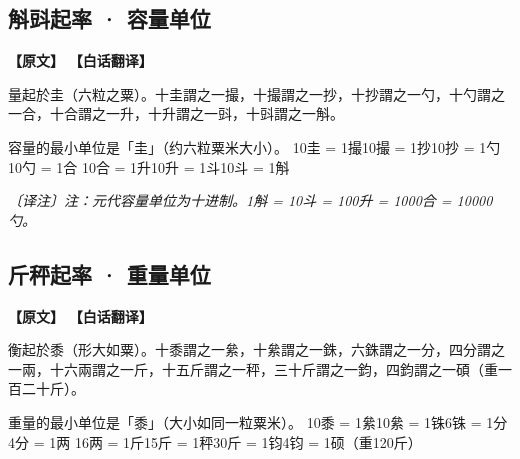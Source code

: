 \documentclass[11pt,a4paper]{article}
\newcommand{\noteMOD}[1]{\par\textcolor{notecolor}{\small\textit{〔译注〕#1}}\par\smallskip}
\begin{document}
\medskip

\subsection{斛㪷起率 · 容量单位}

\begin{paracol}{2}
\noindent\textbf{\textcolor{leftlabel}{【原文】}}
\switchcolumn
\noindent\textbf{\textcolor{rightlabel}{【白话翻译】}}
\switchcolumn*

量起於圭（六粒之粟）。十圭謂之一撮，十撮謂之一抄，十抄謂之一勺，十勺謂之一合，十合謂之一升，十升謂之一㪷，十㪷謂之一斛。

\switchcolumn

容量的最小单位是「圭」（约六粒粟米大小）。\break
10圭 = 1撮\quad 10撮 = 1抄\quad 10抄 = 1勺\quad 10勺 = 1合\quad
10合 = 1升\quad 10升 = 1斗\quad 10斗 = 1斛

\noteMOD{注：元代容量单位为十进制。1斛 = 10斗 = 100升 = 1000合 = 10000勺。}

\end{paracol}

\medskip

\subsection{斤秤起率 · 重量单位}

\begin{paracol}{2}
\noindent\textbf{\textcolor{leftlabel}{【原文】}}
\switchcolumn
\noindent\textbf{\textcolor{rightlabel}{【白话翻译】}}
\switchcolumn*

衡起於黍（形大如粟）。十黍謂之一絫，十絫謂之一銖，六銖謂之一分，四分謂之一兩，十六兩謂之一斤，十五斤謂之一秤，三十斤謂之一鈞，四鈞謂之一碩（重一百二十斤）。

\switchcolumn

重量的最小单位是「黍」（大小如同一粒粟米）。\break
10黍 = 1絫\quad 10絫 = 1铢\quad 6铢 = 1分\quad 4分 = 1两\quad
16两 = 1斤\quad 15斤 = 1秤\quad 30斤 = 1钧\quad 4钧 = 1硕（重120斤）

\end{paracol}

\medskip

\end{document}
